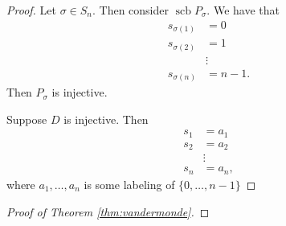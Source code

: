 \documentclass{article}
\DeclareMathOperator{\scb}{scb}
\begin{document}
\begin{proof}
    Let $\sigma \in S_n$.
    Then consider $\scb P_\sigma$. We have that
    \begin{align*}
        s_{\sigma(1)} &= 0 \\
        s_{\sigma(2)} &= 1 \\
                      &\vdots \\
        s_{\sigma(n)} &= n-1.
    \end{align*}
    Then $P_\sigma$ is injective.

    Suppose $D$ is injective. Then
    \begin{align*}
        s_{1} &= a_1 \\
        s_{2} &= a_2 \\
                      &\vdots \\
        s_{n} &= a_n,
    \end{align*}
    where $a_1,\ldots,a_n$ is some labeling of $\{0,\ldots,n-1\}$
\end{proof}

\begin{proof}[Proof of Theorem \ref{thm:vandermonde}]


\end{proof}
\end{document}
